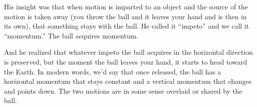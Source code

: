 \documentclass[
  letterpaper,
  DIV=11,
  numbers=noendperiod,
  oneside]{scrreprt}
\begin{document}
His insight was that when motion is imparted to an object and the source
of the motion is taken away (you throw the ball and it leaves your hand
and is then in its own), that something stays with the ball. He called
it ``impeto'' and we call it ``momentum.'' The ball acquires momentum.

And he realized that whatever impeto the ball acquires in the horizontal
direction is preserved, but the moment the ball leaves your hand, it
starts to head toward the Earth. In modern words, we'd say that once
released, the ball has a horizontal momentum that stays constant and a
vertical momentum that changes and points down. The two motions are in
some sense overlaid or shared by the ball.

{
\makeatletter
\def\LT@makecaption#1#2#3{%
  \noalign{\smash{\hbox{\kern\textwidth\rlap{\kern\marginparsep
  \parbox[t]{\marginparwidth}{%
    \footnotesize{%
      \vspace{(1.1\baselineskip)}
    #1{#2: }\ignorespaces #3}}}}}}%
    }
\makeatother

\begin{figure}



\end{figure}%

}
\end{document}
